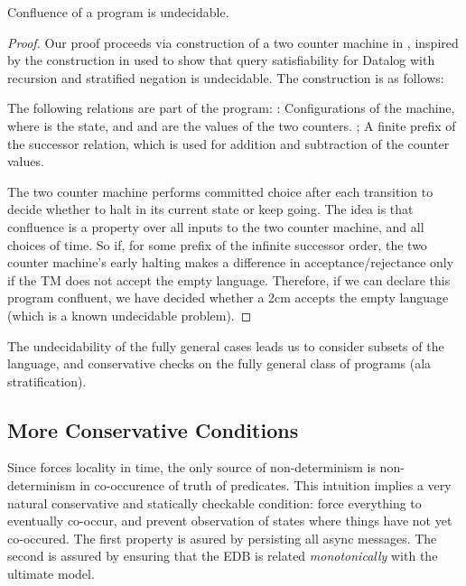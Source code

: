 \begin{lemma}
Confluence of a \lang program is undecidable.
\end{lemma}
\begin{proof}
Our proof proceeds via construction of a two counter machine in \lang, inspired by the construction in  used to show that query satisfiability for Datalog with recursion and stratified negation is undecidable.  The construction is as follows:

The following relations are part of the program:
: Configurations of the machine, where  is the state, and  and  are the values of the two counters.
; A finite prefix of the successor relation, which is used for addition and subtraction of the counter values.


The two counter machine performs committed choice after each transition to decide whether to halt in its current state or keep going.  The idea is that confluence is a property over all inputs to the two counter machine, and all choices of time.  So if, for some prefix of the infinite successor order, the two counter machine's early halting makes a difference in acceptance/rejectance only if the TM does not accept the empty language.  Therefore, if we can declare this program confluent, we have decided whether a 2cm accepts the empty language (which is a known undecidable problem). 

\end{proof}


The undecidability of the fully general cases leads us to consider subsets of the language, and conservative checks on the fully general class of programs (ala stratification).

\subsection{More Conservative Conditions}

Since \lang forces locality in time, the only source of non-determinism is non-determinism in co-occurence of truth of predicates.  This intuition implies a very natural conservative and statically checkable condition: force everything to eventually co-occur, and prevent observation of states where things have not yet co-occured.  The first property is asured by persisting all async messages.  The second is assured by ensuring that the EDB is related {\em monotonically} with the ultimate model.

